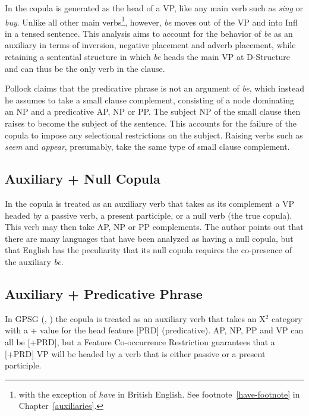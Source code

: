 In \cite{pollack89} the copula is generated as the head of a VP, like any main 
verb such as {\it sing} or {\it buy}. Unlike all other main verbs\footnote{with the exception of {\it have} in British English. See footnote~\ref{have-footnote} in Chapter~\ref{auxiliaries}.}, however, {\it be} 
moves out of the VP and into Infl in a tensed sentence.  This analysis aims to 
account for the behavior of {\it be} as an auxiliary in terms of inversion, 
negative placement and adverb placement, while retaining a sentential structure 
in which {\it be} heads the main VP at D-Structure and can thus be the only 
verb in the clause. 
 
Pollock claims that the predicative phrase is not an argument of {\it be}, 
which instead he assumes to take a small clause complement, consisting of a 
node dominating an NP and a predicative AP, NP or PP. The subject NP of the 
small clause then raises to become the subject of the sentence.  This accounts 
for the failure of the copula to impose any selectional restrictions on the 
subject.  Raising verbs such as {\it seem} and {\it appear}, presumably, take the 
same type of small clause complement. 
 
\subsection{Auxiliary + Null Copula} 
\label{la} 
 
In \cite{lapointe80} the copula is treated as an auxiliary verb that takes as its 
complement a VP headed by a passive verb, a present participle, or a null verb 
(the true copula). This verb may then take AP, NP or PP complements.  The 
author points out that there are many languages that have been analyzed as 
having a null copula, but that English has the peculiarity that its 
null copula requires the co-presence of the auxiliary {\it be}. 
 
\subsection{Auxiliary + Predicative Phrase} 
\label{gpsg} 
 
In GPSG (\cite{gazdar85}, \cite{sag85}) the copula is treated as an auxiliary 
verb that takes an X$^{2}$ category with a + value for the head feature 
[PRD] (predicative). AP, NP, PP and VP can all be [+PRD], but a 
Feature Co-occurrence Restriction guarantees that a [+PRD] VP will be 
headed by a verb that is either passive or a present participle. 
 
